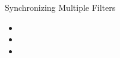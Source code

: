 \begin{frame}
Synchronizing Multiple Filters
 \begin{itemize}
 \item
 \item
 \item
\end{itemize}
\end{frame}
